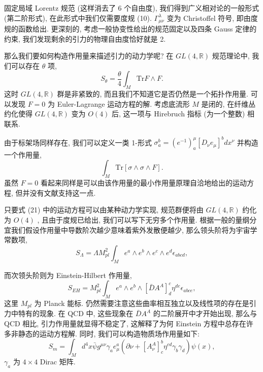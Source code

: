 \documentclass{article}
\begin{document}
固定局域 Lorentz 规范 (这样消去了 6 个自由度), 我们得到广义相对论的一般形式 (第二阶形式), 在此形式中我们仅需要度规 (10). $\Gamma_{\mu\nu}^{\lambda}$ 变为 Christoffel 符号, 即由度规的函数给出. 更深刻的, 考虑一般协变性给出的规范固定以及四条 Gauss 定律的约束, 我们发现剩余的引力的物理自由度恰好就是 2.

那么我们要如何构造作用量来描述引力的动力学呢? 在 $GL(4,\mathbb{R})$ 规范理论中, 我们可以存在 $\theta$ 项,
\begin{equation}
S_{\theta}=\frac{\theta}{4}\int_{M} \text{Tr} F\wedge F.
\end{equation}
这时 $GL(4, \mathbb{R})$ 群是非紧致的, 而且我们不知道它是否仍然是一个拓扑作用量. 可以发现 $F=0$ 为 Euler-Lagrange 运动方程的解. 考虑底流形 $M$ 是闭的, 在纤维丛约化使得  $GL(4, \mathbb{R})$ 变为  $O(4)$ 后, 这一项与 Hirebruch 指标 (为一个整数) 相联系.

由于标架场同样存在, 我们可以定义一类 1-形式 $\sigma_{a}^{b}=(e^{-1})_{a}^{\mu}[D_{\nu}e_{\mu}]^{b}dx^{\nu}$ 并构造一个作用量,
\begin{equation}
\int_{M} \text{Tr}[\sigma\wedge\sigma\wedge F].
\end{equation}
虽然 $F=0$ 看起来同样是可以由该作用量的最小作用量原理自洽地给出的运动方程, 但并没有文献支持这一点.

只要式 (21) 中的运动方程可以由某种动力学实现, 规范群便将由 $GL(4, \mathbb{R})$ 约化为  $O(4)$ , 且由于度规已给出, 我们可以写下无穷多个作用量. 根据一般的量纲分宜我们假设作用量中导数阶次越少意味着紫外发散便越少, 那么领头阶将为宇宙学常数项,
\begin{equation}
S_{\Lambda}=\Lambda M^{2}_{pl}\int_{M}e^{a}\wedge e^{b} \wedge e^{c} \wedge e^{d} \epsilon_{abcd},
\end{equation}

而次领头阶则为 Einstein-Hilbert 作用量,
\begin{equation}
S_{EH}=M^{2}_{pl}\int_{M}e^{a}\wedge e^{b} \wedge [\bar{D}A^{A}]_{d}^{c} \eta^{de}\epsilon_{abce},
\end{equation}
这里 $M_{pl}$ 为 Planck 能标. 仍然需要注意这些曲率相互独立以及线性项的存在是引力中特有的现象. 在 QCD 中, 这些现象在 $\bar{D}A^{A}$ 的二阶展开中才开始出现, 那么与 QCD 相比, 引力作用量就显得不稳定了, 这解释了为何 Einstein 方程中总存在许多非静态的运动方程解. 同时, 我们可以构造物质场作用量如下:
\begin{equation}
S_{m}=\int_{M}d^{4}x\bar{\psi}g^{\mu\nu}\gamma_{a}e^{a}_{\mu}(\partial\nu+[A_{\nu}^{A}]^{b}_{c}\eta^{cd}\gamma_{b}\gamma_{d})\psi(x),
\end{equation}
$\gamma_{a}$ 为 $4\times 4$ Dirac 矩阵.
\end{document}
